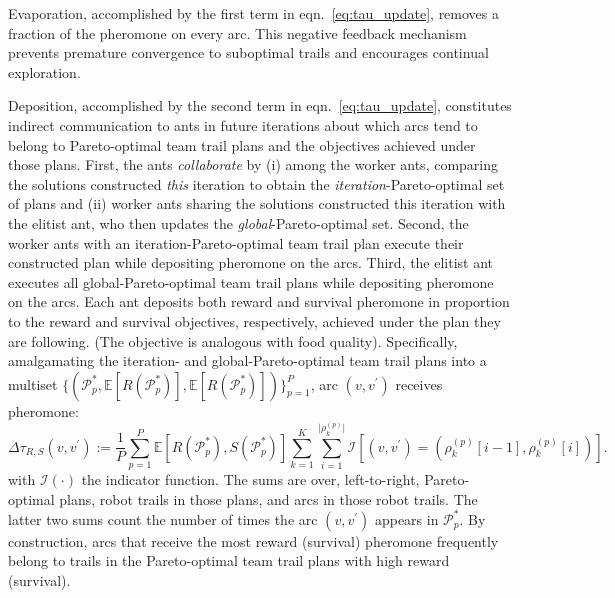 \documentclass[fleqn,10pt,lineno]{wlpeerj}
\begin{document}
Evaporation, accomplished by the first term in eqn.~\ref{eq:tau_update}, removes a fraction of the pheromone on every arc. This negative feedback mechanism prevents premature convergence to suboptimal trails and encourages continual exploration.

Deposition, accomplished by the second term in eqn.~\ref{eq:tau_update}, constitutes indirect communication to ants in future iterations about which arcs tend to belong to Pareto-optimal team trail plans and the objectives achieved under those plans.
First, the ants \emph{collaborate} by 
(i) among the worker ants, comparing the solutions constructed \emph{this} iteration to obtain the \emph{iteration}-Pareto-optimal set of plans
and 
(ii) worker ants sharing the solutions constructed this iteration with the elitist ant, who then updates the \emph{global}-Pareto-optimal set.
Second, the worker ants with an iteration-Pareto-optimal team trail plan execute their constructed plan while depositing pheromone on the arcs.
Third, the elitist ant executes all global-Pareto-optimal team trail plans while depositing pheromone on the arcs. Each ant deposits both reward and survival pheromone in proportion to the reward and survival objectives, respectively, achieved under the plan they are following. (The objective is analogous with food quality). 
Specifically, amalgamating the iteration- and global-Pareto-optimal team trail plans into a multiset $\{(\mathcal{P}_p^*, \mathbb{E}[R(\mathcal{P}_p^*)], \mathbb{E}[R(\mathcal{P}_p^*)])\}_{p=1}^P$, arc $(v, v^\prime)$ receives pheromone:
\begin{equation}
	 \Delta \tau_{R,S}(v, v^\prime) := 
	\frac{1}{P} \sum_{p=1}^{P} \mathbb{E}[R(\mathcal{P}^*_p), S(\mathcal{P}^*_p)] 
	\sum_{k=1}^K 
	\sum_{i=1}^{\lvert \rho_k^{(p)}\rvert}
	\mathcal{I} \left[ 
		(v, v^\prime)=(\rho_k^{(p)}[i-1], \rho_k^{(p)}[i])
	\right].
\end{equation}
with $\mathcal{I}(\cdot)$ the indicator function.
The sums are over, left-to-right, Pareto-optimal plans, robot trails in those plans, and arcs in those robot trails. 
The latter two sums count the number of times the arc $(v, v^\prime)$ appears in $\mathcal{P}^*_p$.
By construction, arcs that receive the most reward (survival) pheromone frequently belong to trails in the Pareto-optimal team trail plans with high reward (survival).
\end{document}
